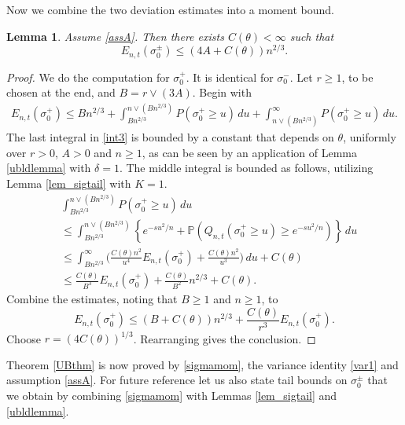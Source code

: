 \documentclass[11pt]{amsart}
\newtheorem{lemma}[theorem]{\sc Lemma}
\numberwithin{equation}{section}
\theoremstyle{remark}
\begin{document}
Now we combine the two deviation estimates into a  moment bound.  

\begin{lemma}   Assume \eqref{assA}.   
 Then there exists  $C({\theta})<\infty$ such that 
\begin{equation}  E_{n,t}(\sigma_0^\pm) \le (4A+C({\theta}))n^{2/3}.
\label{sigmamom}\end{equation}
\end{lemma}
\begin{proof}  We do the computation for $\sigma_0^+$. It is identical for $\sigma_0^-$.
  Let $r\ge 1$, to be chosen at the end,
and $B=r\vee (3A)$.  Begin with 
\begin{align}
 E_{n,t}(\sigma_0^+) \le Bn^{2/3} + \int_{Bn^{2/3}}^{n\vee (Bn^{2/3})} P(\sigma_0^+\ge u)\,du 
 + \int_{n\vee (Bn^{2/3})}^\infty P(\sigma_0^+\ge u)\,du.
\label{int3}\end{align}
The last integral in \eqref{int3} is bounded by a constant that depends on ${\theta}$,
 uniformly over $r>0$, $A>0$ and  $n\ge 1$,  
as can be seen by an application of  Lemma \ref{ubldlemma} with $\delta=1$. 
The middle integral is bounded as follows, utilizing Lemma \ref{lem_sigtail} with $K=1$.  
\begin{align*}
  &\int_{Bn^{2/3}}^{n\vee (Bn^{2/3})} P(\sigma_0^+\ge u)\,du \\
 &\le   \int_{Bn^{2/3}}^{n\vee (Bn^{2/3})} \left\{ e^{-s u^2/n}+{\mathbb{P}}(Q_{n,t}(\sigma_0^+\ge u) \ge e^{-su^2/n})\right\}\,du
\\
   &\le \int_{Bn^{2/3}}^\infty   \biggl(   \frac{C({\theta}) n^2}{u^4} 
E_{n,t} (\sigma_0^+) + \frac{C({\theta}) n^2}{u^3}  \biggr) \,du   + C({\theta}) \\[3pt]
&\le  \frac{C({\theta})}{B^3} E_{n,t} (\sigma_0^+) + \frac{C({\theta}) }{B^2}n^{2/3}  + C({\theta}).   \end{align*}
Combine the estimates, noting that $B\ge 1$ and $n\ge 1$,  to 
\[    E_{n,t}(\sigma_0^+) \le (B+C({\theta})) n^{2/3} + \frac{C({\theta})}{r^3} E_{n,t} (\sigma_0^+). \]
Choose $r=(4C({\theta}))^{1/3}$.  Rearranging gives the conclusion.  
\end{proof}

Theorem \ref{UBthm} is now proved by \eqref{sigmamom}, the variance identity \eqref{var1} 
and assumption \eqref{assA}.   For future reference let us also state tail bounds
on $\sigma_0^\pm$ that we obtain by combining \eqref{sigmamom} with   Lemmas
 \ref{lem_sigtail} and \ref{ubldlemma}.
 
\end{document}
